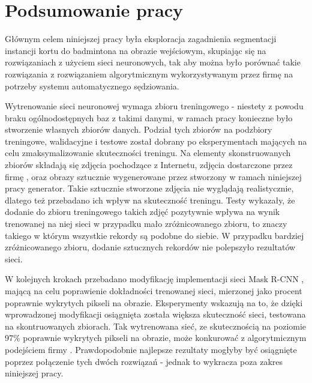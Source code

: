 \chapter{Podsumowanie pracy}

Głównym celem niniejszej pracy była eksploracja zagadnienia segmentacji instancji kortu do badmintona na obrazie wejściowym, skupiając się na rozwiązaniach z użyciem sieci neuronowych, tak aby można było porównać takie rozwiązania z rozwiązaniem algorytmicznym wykorzystywanym przez firmę \blue{} na potrzeby systemu automatycznego sędziowania.

Wytrenowanie sieci neuronowej wymaga zbioru treningowego - niestety z powodu braku ogólnodostępnych baz z takimi danymi, w ramach pracy konieczne było stworzenie własnych zbiorów danych. Podział tych zbiorów na podzbiory treningowe, walidacyjne i testowe został dobrany po eksperymentach mających na celu zmaksymalizowanie skuteczności treningu. Na elementy skonstruowanych zbiorów składają się zdjęcia pochodzące z Internetu, zdjęcia dostarczone przez firmę \blue{}, oraz obrazy sztucznie wygenerowane przez stworzony w ramach niniejszej pracy generator. Takie sztucznie stworzone zdjęcia nie wyglądają realistycznie, dlatego też przebadano ich wpływ na skuteczność treningu. Testy wykazały, że dodanie do zbioru treningowego takich zdjęć pozytywnie wpływa na wynik trenowanej na niej sieci w przypadku mało zróżnicowanego zbioru, to znaczy takiego w którym wszystkie rekordy są podobne do siebie. W przypadku bardziej zróżnicowanego zbioru, dodanie sztucznych rekordów nie polepszyło rezultatów sieci.

W kolejnych krokach przebadano modyfikację implementacji sieci Mask R-CNN \cite{matterport-mask-rcnn}, mającą na celu poprawienie dokładności trenowanej sieci, mierzonej jako procent poprawnie wykrytych pikseli na obrazie. Eksperymenty wskazują na to, że dzięki wprowadzonej modyfikacji osiągnięta została większa skuteczność sieci, testowana na skontruowanych zbiorach. Tak wytrenowana sieć, ze skutecznością na poziomie 97\% poprawnie wykrytych pikseli na obrazie, może konkurować z algorytmicznym podejściem firmy \blue{}. Prawdopodobnie najlepsze rezultaty mogłyby być osiągnięte poprzez połączenie tych dwóch rozwiązań - jednak to wykracza poza zakres niniejszej pracy.

